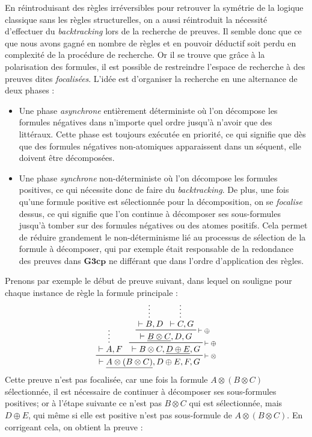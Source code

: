\documentclass[11pt]{report}
\newcommand{\seq}{\vdash}
\newcommand{\irule}[1]{\footnotesize$#1$}
\newcommand{\iruleR}[1]{\irule{\seq{#1}}}
\begin{document}
En réintroduisant des règles irréversibles pour retrouver la symétrie de la logique classique sans les règles structurelles, on a aussi réintroduit la nécessité d'effectuer du \textit{backtracking} lors de la recherche de preuves. Il semble donc que ce que nous avons gagné en nombre de règles et en pouvoir déductif soit perdu en complexité de la procédure de recherche. Or il se trouve que grâce à la polarisation des formules, il est possible de restreindre l'espace de recherche à des preuves dites \emph{focalisées}. L'idée est d'organiser la recherche en une alternance de deux phases :
\begin{itemize}
	\item Une phase \emph{asynchrone} entièrement déterministe où l'on décompose les formules négatives dans n'importe quel ordre jusqu'à n'avoir que des littéraux. Cette phase est toujours exécutée en priorité, ce qui signifie que dès que des formules négatives non-atomiques apparaissent dans un séquent, elle doivent être décomposées.
	\item Une phase \emph{synchrone} non-déterministe où l'on décompose les formules positives, ce qui nécessite donc de faire du \textit{backtracking}. De plus, une fois qu'une formule positive est sélectionnée pour la décomposition, on se \emph{focalise} dessus, ce qui signifie que l'on continue à décomposer ses sous-formules jusqu'à tomber sur des formules négatives ou des atomes positifs. Cela permet de réduire grandement le non-déterminisme lié au processus de sélection de la formule à décomposer, qui par exemple était responsable de la redondance des preuves dans $\mathbf{G3cp}$ ne différant que dans l'ordre d'application des règles.
\end{itemize}
Prenons par exemple le début de preuve suivant, dans lequel on souligne pour chaque instance de règle la formule principale :
\begin{displaymath}
	\prftree[r]{\iruleR{\otimes}}
		{\prfsummary{\seq A,F}}
		{\prftree[r]{\iruleR{\oplus}}
			{\prftree[r]{\iruleR{\oplus}}
				{\prfsummary{\seq B,D}}
				{\prfsummary{\seq C,G}}
				{\seq \underline{B \otimes C},D,G}}
			{\seq B \otimes C,\underline{D \oplus E},G}}
		{\seq \underline{A \otimes (B \otimes C)},D \oplus E,F,G}
\end{displaymath}
Cette preuve n'est pas focalisée, car une fois la formule $A \otimes (B \otimes C)$ sélectionnée, il est nécessaire de continuer à décomposer ses sous-formules positives; or à l'étape suivante ce n'est pas $B \otimes C$ qui est sélectionnée, mais $D \oplus E$, qui même si elle est positive n'est pas sous-formule de $A \otimes (B \otimes C)$. En corrigeant cela, on obtient la preuve :
\end{document}
